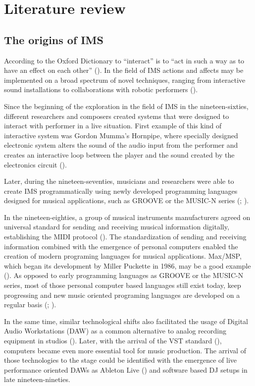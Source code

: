 \section{Literature review}

\subsection{The origins of IMS}

According to the Oxford Dictionary to ``interact'' is to ``act in such a way as to have an effect on each other'' (\cite{web:oxford}).
In the field of IMS actions and affects may be implemented on a broad spectrum of novel techniques, ranging from interactive sound installations to collaborations with robotic performers (\cite{drummond09}).

Since the beginning of the exploration in the field of IMS in the nineteen-sixties, different researchers and composers created systems that were designed to interact with performer in a live situation.
First example of this kind of interactive system was Gordon Mumma's Hornpipe, where specially designed electronic system alters the sound of the audio input from the performer and creates an interactive loop between the player and the sound created by the electronics circuit (\cite[page 12]{winkler01}).

Later, during the nineteen-seventies, musicians and researchers were able to create IMS programmatically using newly developed programming languages designed for musical applications, such as GROOVE or the MUSIC-N series (\cite{mathews70}; \cite{mathews69}).

In the nineteen-eighties, a group of musical instruments manufacturers agreed on universal standard for sending and receiving musical information digitally, establishing the MIDI protocol (\cite{web:quinn}).
The standardization of sending and receiving information combined with the emergence of personal computers enabled the creation of modern programing languages for musical applications.
Max/MSP, which began its development by Miller Puckette in 1986, may be a good example (\cite[page 16]{winkler01}).
As opposed to early programming languages as GROOVE or the MUSIC-N series, most of those personal computer based languages still exist today, keep progressing and new music oriented programing languages are developed on a regular basis (\cite{web:chuck}; \cite{web:usine}).

In the same time, similar technological shifts also facilitated the usage of Digital Audio Workstations (DAW) as a common alternative to analog recording equipment in studios (). Later, with the arrival of the VST standard (\cite{web:steinberg}), computers became even more essential tool for music production.
The arrival of those technologies to the stage could be identified with the emergence of live performance oriented DAWs as Ableton Live (\cite{web:live}) and software based DJ setups in late nineteen-nineties.

